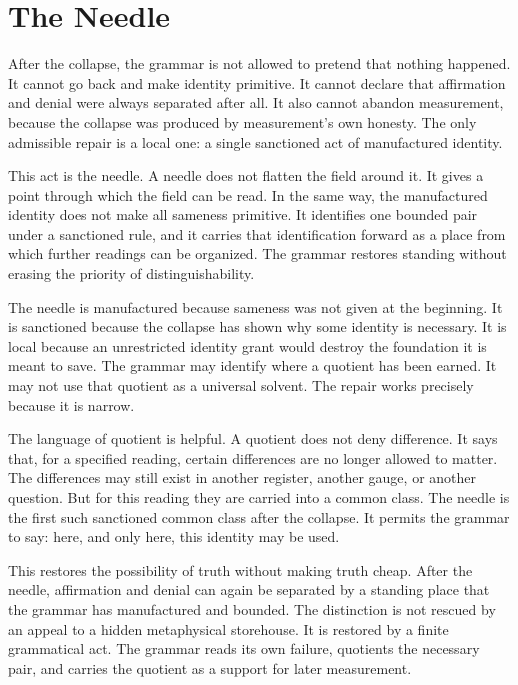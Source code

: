 \section{The Needle}

After the collapse, the grammar is not allowed to pretend that nothing
happened. It cannot go back and make identity primitive. It cannot
declare that affirmation and denial were always separated after all. It
also cannot abandon measurement, because the collapse was produced by
measurement's own honesty. The only admissible repair is a local one: a
single sanctioned act of manufactured identity.

This act is the needle. A needle does not flatten the field around it.
It gives a point through which the field can be read. In the same way,
the manufactured identity does not make all sameness primitive. It
identifies one bounded pair under a sanctioned rule, and it carries that
identification forward as a place from which further readings can be
organized. The grammar restores standing without erasing the priority of
distinguishability.

The needle is manufactured because sameness was not given at the
beginning. It is sanctioned because the collapse has shown why some
identity is necessary. It is local because an unrestricted identity
grant would destroy the foundation it is meant to save. The grammar may
identify where a quotient has been earned. It may not use that quotient
as a universal solvent. The repair works precisely because it is narrow.

The language of quotient is helpful. A quotient does not deny
difference. It says that, for a specified reading, certain differences
are no longer allowed to matter. The differences may still exist in
another register, another gauge, or another question. But for this
reading they are carried into a common class. The needle is the first
such sanctioned common class after the collapse. It permits the grammar
to say: here, and only here, this identity may be used.

This restores the possibility of truth without making truth cheap. After
the needle, affirmation and denial can again be separated by a standing
place that the grammar has manufactured and bounded. The distinction is
not rescued by an appeal to a hidden metaphysical storehouse. It is
restored by a finite grammatical act. The grammar reads its own failure,
quotients the necessary pair, and carries the quotient as a support for
later measurement.

